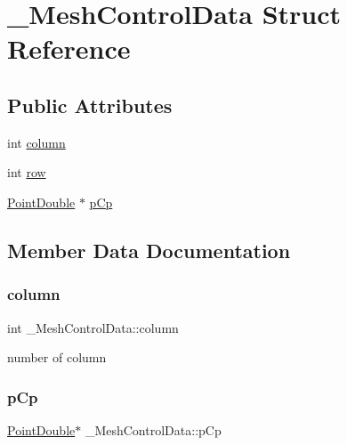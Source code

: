 \hypertarget{struct___mesh_control_data}{}\section{\+\_\+\+Mesh\+Control\+Data Struct Reference}
\label{struct___mesh_control_data}
\subsection*{Public Attributes}
\begin{DoxyCompactItemize}
\item 
int \mbox{\hyperlink{struct___mesh_control_data_a3ce4c585ce3b8c434736a6aeafbf8191}{column}}
\item 
int \mbox{\hyperlink{struct___mesh_control_data_a282572be6466c1e1761fb9fa56846741}{row}}
\item 
\mbox{\hyperlink{struct___point_double}{Point\+Double}} $\ast$ \mbox{\hyperlink{struct___mesh_control_data_a9477d1f3207021a27501dbae79940c0a}{p\+Cp}}
\end{DoxyCompactItemize}


\subsection{Member Data Documentation}
\mbox{\label{struct___mesh_control_data_a3ce4c585ce3b8c434736a6aeafbf8191}} 
\subsubsection{\texorpdfstring{column}{column}}
{\footnotesize\ttfamily int \+\_\+\+Mesh\+Control\+Data\+::column}

number of column \mbox{\label{struct___mesh_control_data_a9477d1f3207021a27501dbae79940c0a}} 
\subsubsection{\texorpdfstring{p\+Cp}{pCp}}
{\footnotesize\ttfamily \mbox{\hyperlink{struct___point_double}{Point\+Double}}$\ast$ \+\_\+\+Mesh\+Control\+Data\+::p\+Cp}

